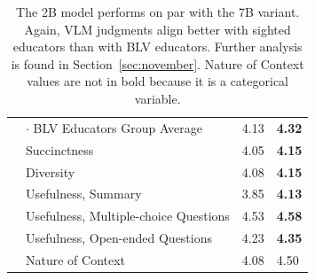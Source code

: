 \begin{table}
\begin{tabular}{llll}
        & $\cdot$ BLV Educators Group Average       & 4.13 & \textbf{4.32} \\
        & Succinctness                              & 4.05 & \textbf{4.15} \\
        & Diversity                                 & 4.08 & \textbf{4.15} \\
        & Usefulness, Summary                       & 3.85 & \textbf{4.13} \\
        & Usefulness, Multiple-choice Questions     & 4.53 & \textbf{4.58} \\
        & Usefulness, Open-ended Questions          & 4.23 & \textbf{4.35} \\
        & Nature of Context                         & 4.08 & 4.50 \\

    \bottomrule
    \end{tabular}
\caption{The 2B model performs on par with the 7B variant. Again, VLM judgments align better with sighted educators than with BLV educators. Further analysis is found in Section~\ref{sec:november}. Nature of Context values are not in bold because it is a categorical variable.}
\end{table}



